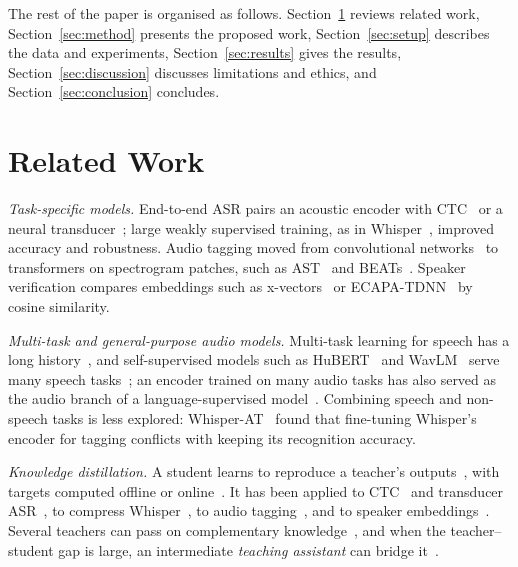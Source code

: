 \documentclass[lettersize,journal]{IEEEtran}
\begin{document}
The rest of the paper is organised as follows. Section~\ref{sec:related} reviews related work,
Section~\ref{sec:method} presents the proposed work, Section~\ref{sec:setup} describes the data and experiments,
Section~\ref{sec:results} gives the results, Section~\ref{sec:discussion} discusses limitations and ethics, and
Section~\ref{sec:conclusion} concludes.

\section{Related Work}\label{sec:related}

\textit{Task-specific models.} End-to-end ASR pairs an acoustic encoder with CTC~\cite{graves2006ctc} or a neural
transducer~\cite{graves2012transducer}; large weakly supervised training, as in Whisper~\cite{radford2023whisper},
improved accuracy and robustness. Audio tagging moved from convolutional networks~\cite{choi2016tagging,kong2020panns}
to transformers on spectrogram patches, such as AST~\cite{gong2021ast} and BEATs~\cite{chen2023beats}. Speaker
verification compares embeddings such as x-vectors~\cite{snyder2019xvector} or ECAPA-TDNN~\cite{desplanques2020ecapa}
by cosine similarity.

\textit{Multi-task and general-purpose audio models.} Multi-task learning for speech has a long
history~\cite{tang2016multitask,pironkov2016overview}, and self-supervised models such as HuBERT~\cite{hsu2021hubert}
and WavLM~\cite{chen2022wavlm} serve many speech tasks~\cite{yang2021superb}; an encoder trained on many audio tasks
has also served as the audio branch of a language-supervised model~\cite{elizalde2024clap}. Combining speech and
non-speech tasks is less explored: Whisper-AT~\cite{gong2023whisperat} found that fine-tuning Whisper's encoder for
tagging conflicts with keeping its recognition accuracy.

\textit{Knowledge distillation.} A student learns to reproduce a teacher's outputs~\cite{hinton2014distilling,li2014smalldnn},
with targets computed offline or online~\cite{beyer2022patient}. It has been applied to CTC~\cite{takashima2018ctckd}
and transducer ASR~\cite{yang2022transducerkd}, to compress Whisper~\cite{gandhi2023distilwhisper}, to audio
tagging~\cite{schmid2023efficientat,dinkel2024ced}, and to speaker embeddings~\cite{wang2019speakerkd}. Several
teachers can pass on complementary knowledge~\cite{huang2023ensemblekd,yang2023multifoundation,ranzinger2024amradio},
and when the teacher--student gap is large, an intermediate \emph{teaching assistant} can bridge it~\cite{mirzadeh2020takd}.
\end{document}
